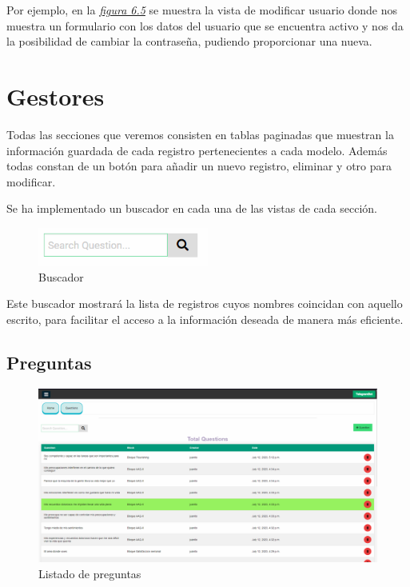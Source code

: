 Por ejemplo, en la \textit{\hyperref[fig:modify-user]{figura 6.5}} se muestra la vista de modificar usuario donde nos muestra un formulario con los datos del usuario que se encuentra activo y nos da la posibilidad de cambiar la contraseña, pudiendo proporcionar una nueva.



\section{Gestores}


Todas las secciones que veremos consisten en tablas paginadas que muestran la información guardada de cada registro pertenecientes a cada modelo. Además todas constan de un botón para añadir un nuevo registro, eliminar y otro para modificar. \vspace{0.3cm}

Se ha implementado un buscador en cada una de las vistas de cada sección.

\begin{figure}[!ht]
    \centering
    \includegraphics[width=0.5\textwidth]{imagenes/search.png}
    \caption{ Buscador }
    \label{fig:enter-label}
\end{figure}

Este buscador mostrará la lista de registros cuyos nombres coincidan con aquello escrito, para facilitar el acceso a la información deseada de manera más eficiente.

\subsection{Preguntas}

\begin{figure}[!ht]
    \centering
    \includegraphics[width=1\textwidth]{imagenes/list_quest.png}
    \caption{ Listado de preguntas }
    \label{fig:vista-preguntas}
\end{figure}\vspace{1cm}

